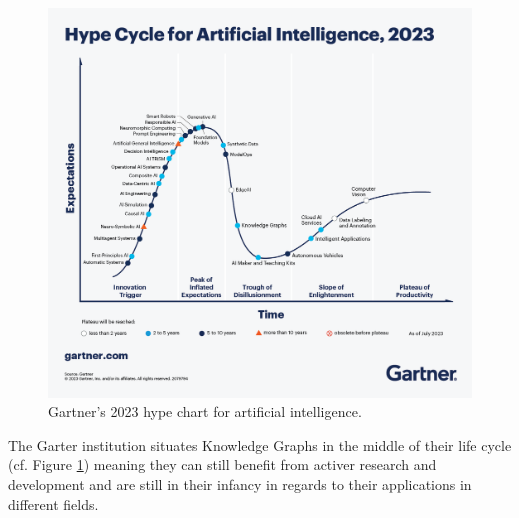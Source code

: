\begin{figure}[!htp]
    \centering
    \includegraphics[width=\textwidth]{fig/intro/Gartner_2023.png}
    \caption{Gartner's 2023 hype chart for artificial intelligence.}
    \label{fig:garter-chart}
\end{figure}

The Garter institution situates Knowledge Graphs in the middle of their life cycle (cf. Figure \ref{fig:garter-chart}) meaning they can still benefit from activer research and development and are still in their infancy in regards to their applications in different fields.




